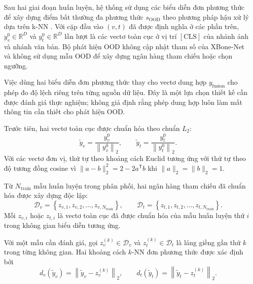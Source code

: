 Sau hai giai đoạn huấn luyện, hệ thống sử dụng các biểu diễn đơn phương thức để xây dựng điểm bất thường đa phương thức $s_{\mathrm{OOD}}$ theo phương pháp hậu xử lý dựa trên k-NN \cite{Sun2022KNN}. Với cặp đầu vào $(v,t)$ đã được định nghĩa ở các phần trên, $y_v^0\in\mathbb{R}^{D}$ và $y_t^0\in\mathbb{R}^{D}$ lần lượt là các vectơ toàn cục ở vị trí $[\mathrm{CLS}]$ của nhánh ảnh và nhánh văn bản. Bộ phát hiện OOD không cập nhật tham số của XBone-Net và không sử dụng mẫu OOD để xây dựng ngân hàng tham chiếu hoặc chọn ngưỡng.

Việc dùng hai biểu diễn đơn phương thức thay cho vectơ dung hợp $y_{\mathrm{fusion}}$ cho phép đo độ lệch riêng trên từng nguồn dữ liệu. Đây là một lựa chọn thiết kế cần được đánh giá thực nghiệm; không giả định rằng phép dung hợp luôn làm mất thông tin cần thiết cho phát hiện OOD.

Trước tiên, hai vectơ toàn cục được chuẩn hóa theo chuẩn $L_2$:
\begin{equation}
\widetilde{y}_v
=
\frac{y_v^0}{\left\lVert y_v^0\right\rVert_2},
\qquad
\widetilde{y}_t
=
\frac{y_t^0}{\left\lVert y_t^0\right\rVert_2}.
\label{eq:ch3_ood_l2_normalization}
\end{equation}
Với các vectơ đơn vị, thứ tự theo khoảng cách Euclid tương ứng với thứ tự theo độ tương đồng cosine vì $\lVert a-b\rVert_2^2=2-2a^{\mathsf T}b$ khi $\lVert a\rVert_2=\lVert b\rVert_2=1$.

Từ $N_{\mathrm{train}}$ mẫu huấn luyện trong phân phối, hai ngân hàng tham chiếu đã chuẩn hóa được xây dựng độc lập:
\begin{equation}
\mathcal{D}_v
=
\left\{z_{v,1},z_{v,2},\ldots,z_{v,N_{\mathrm{train}}}\right\},
\qquad
\mathcal{D}_t
=
\left\{z_{t,1},z_{t,2},\ldots,z_{t,N_{\mathrm{train}}}\right\}.
\label{eq:ch3_ood_reference_banks}
\end{equation}
Mỗi $z_{v,i}$ hoặc $z_{t,i}$ là vectơ toàn cục đã được chuẩn hóa của mẫu huấn luyện thứ $i$ trong không gian biểu diễn tương ứng.

\pagebreak

Với một mẫu cần đánh giá, gọi $z_v^{(k)}\in\mathcal{D}_v$ và $z_t^{(k)}\in\mathcal{D}_t$ là láng giềng gần thứ $k$ trong từng không gian. Hai khoảng cách $k$-NN đơn phương thức được xác định bởi
\begin{equation}
d_v\!\left(\widetilde{y}_v\right)
=
\left\lVert\widetilde{y}_v-z_v^{(k)}\right\rVert_2,
\qquad
d_t\!\left(\widetilde{y}_t\right)
=
\left\lVert\widetilde{y}_t-z_t^{(k)}\right\rVert_2.
\label{eq:ch3_ood_unimodal_knn}
\end{equation}

